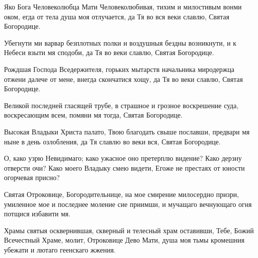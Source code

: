 \begin{mymulticols}


Яко Бога Человеколюбца Мати Человеколюбивая, тихим и милостивым вонми оком, егда от тела душа моя отлучается, да Тя во вся веки славлю, Святая Богородице.


Убегнути ми варвар безплотных полки и воздушныя бездны возникнути, и к Небеси взыти мя сподоби, да Тя во веки славлю, Святая Богородице.


Рождшая Господа Вседержителя, горьких мытарств начальника миродержца отжени далече от мене, внегда скончатися хощу, да Тя во веки славлю, Святая Богородице.

\slava

Великой последней гласящей трубе, в страшное и грозное воскрешение суда, воскресающим всем, помяни мя тогда, Святая Богородице.

\inyne

 Высокая Владыки Христа палато, Твою благодать свыше пославши, предвари мя ныне в день озлобления, да Тя славлю во веки вся, Святая Богородице.




О, како узрю Невидимаго; како ужасное оно претерплю видение? Како дерзну отверсти очи? Како моего Владыку смею видети, Егоже не престаях от юности огорчевая присно?


Святая Отроковице, Богородительнице, на мое смирение милосердно призри, умиленное мое и последнее моление сие приимши, и мучащаго вечнующаго огня потщися избавити мя.


Храмы святыя осквернившая, скверный и телесный храм оставивши, Тебе, Божий Всечестный Храме, молит, Отроковице Дево Мати, душа моя тьмы кромешния убежати и лютаго геенскаго жжения.


\end{mymulticols}
